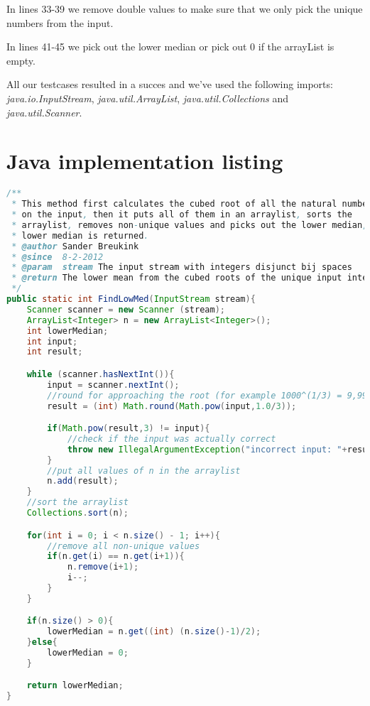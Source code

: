 \documentclass[12pt]{article}
\begin{document}
In lines 33-39 we remove double values to make sure that we only pick the unique numbers from the input.

In lines 41-45 we pick out the lower median or pick out 0 if the arrayList is empty.

All our testcases resulted in a succes and we've used the following imports: \textsl{java.io.InputStream}, \textsl{java.util.ArrayList}, \textsl{java.util.Collections} and \textsl{java.util.Scanner}.

\appendix

\section{Java implementation listing}
\begin{lstlisting}[language=java]
/**
 * This method first calculates the cubed root of all the natural numbers
 * on the input, then it puts all of them in an arraylist, sorts the
 * arraylist, removes non-unique values and picks out the lower median, this
 * lower median is returned.
 * @author Sander Breukink
 * @since  8-2-2012
 * @param  stream The input stream with integers disjunct bij spaces
 * @return The lower mean from the cubed roots of the unique input integers
 */
public static int FindLowMed(InputStream stream){
    Scanner scanner = new Scanner (stream);
    ArrayList<Integer> n = new ArrayList<Integer>();
    int lowerMedian;
    int input;
    int result;

    while (scanner.hasNextInt()){
        input = scanner.nextInt();
        //round for approaching the root (for example 1000^(1/3) = 9,99999999999 -> 10)
        result = (int) Math.round(Math.pow(input,1.0/3));

        if(Math.pow(result,3) != input){
            //check if the input was actually correct
            throw new IllegalArgumentException("incorrect input: "+result+"^3 != " + input);
        }
        //put all values of n in the arraylist
        n.add(result);
    }
    //sort the arraylist
    Collections.sort(n);

    for(int i = 0; i < n.size() - 1; i++){
        //remove all non-unique values
        if(n.get(i) == n.get(i+1)){
            n.remove(i+1);
            i--;
        }
    }

    if(n.size() > 0){
        lowerMedian = n.get((int) (n.size()-1)/2);
    }else{
        lowerMedian = 0;
    }

    return lowerMedian;
}
\end{lstlisting}
\end{document}
